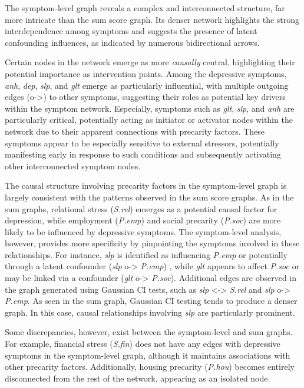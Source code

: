 \documentclass[
]{article}
\begin{document}
The symptom-level graph reveals a complex and interconnected structure,
far more intricate than the sum score graph. Its denser network
highlights the strong interdependence among symptoms and suggests the
presence of latent confounding influences, as indicated by numerous
bidirectional arrows.

Certain nodes in the network emerge as more \emph{causally} central,
highlighting their potential importance as intervention points. Among
the depressive symptoms, \emph{anh}, \emph{dep}, \emph{slp}, and
\emph{glt} emerge as particularly influential, with multiple outgoing
edges (o-\textgreater) to other symptoms, suggesting their roles as
potential key drivers within the symptom network. Especially, symptoms
such as \emph{glt}, \emph{slp}, and \emph{anh} are particularly
critical, potentially acting as initiator or activator nodes within the
network due to their apparent connections with precarity factors. These
symptoms appear to be especially sensitive to external stressors,
potentially manifesting early in response to such conditions and
subsequently activating other interconnected symptom nodes.

The causal structure involving precarity factors in the symptom-level
graph is largely consistent with the patterns observed in the sum score
graphs. As in the sum graphs, relational stress (\emph{S.rel}) emerges
as a potential causal factor for depression, while employment
(\emph{P.emp}) and social precarity (\emph{P.soc}) are more likely to be
influenced by depressive symptoms. The symptom-level analysis, however,
provides more specificity by pinpointing the symptoms involved in these
relationships. For instance, \emph{slp} is identified as influencing
\emph{P.emp} or potentially through a latent confounder (\emph{slp}
o-\textgreater{} \emph{P.emp}) , while \emph{glt} appears to affect
\emph{P.soc} or may be linked via a confounder (\emph{glt}
o-\textgreater{} \emph{P.soc}). Additional edges are observed in the
graph generated using Gaussian CI tests, such as \emph{slp}
\textless-\textgreater{} \emph{S.rel} and \emph{slp} o-\textgreater{}
\emph{P.emp}. As seen in the sum graph, Gaussian CI testing tends to
produce a denser graph. In this case, causal relationships involving
\emph{slp} are particularly prominent.

Some discrepancies, however, exist between the symptom-level and sum
graphs. For example, financial stress (\emph{S.fin}) does not have any
edges with depressive symptoms in the symptom-level graph, although it
maintains associations with other precarity factors. Additionally,
housing precarity (\emph{P.hou}) becomes entirely disconnected from the
rest of the network, appearing as an isolated node.
\end{document}
